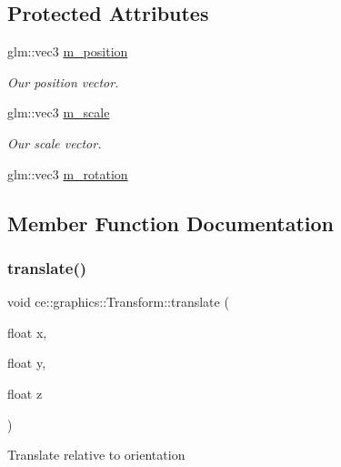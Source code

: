 \subsection*{Protected Attributes}
\begin{DoxyCompactItemize}
\item 
glm\+::vec3 \hyperlink{classce_1_1graphics_1_1_transform_ac55ab1bffbe1250d4bef77798180d592}{m\+\_\+position}
\begin{DoxyCompactList}\small\item\em Our position vector. \end{DoxyCompactList}\item 
glm\+::vec3 \hyperlink{classce_1_1graphics_1_1_transform_a88394bb0517cf741b97f9c9c76d3775e}{m\+\_\+scale}
\begin{DoxyCompactList}\small\item\em Our scale vector. \end{DoxyCompactList}\item 
glm\+::vec3 \hyperlink{classce_1_1graphics_1_1_transform_a1952fc3789a58ab6bb54887bc8374693}{m\+\_\+rotation}
\end{DoxyCompactItemize}


\subsection{Member Function Documentation}
\mbox{\label{classce_1_1graphics_1_1_transform_af9eee7c8504d7f2e5e26446fcd24ec30}} 
\subsubsection{\texorpdfstring{translate()}{translate()}\hspace{0.1cm}{\footnotesize\ttfamily [1/2]}}
{\footnotesize\ttfamily void ce\+::graphics\+::\+Transform\+::translate (\begin{DoxyParamCaption}\item[{float}]{x,  }\item[{float}]{y,  }\item[{float}]{z }\end{DoxyParamCaption})}

Translate relative to orientation \mbox{\label{classce_1_1graphics_1_1_transform_ac9574ab0474bcf721a89f914538a7400}} 
